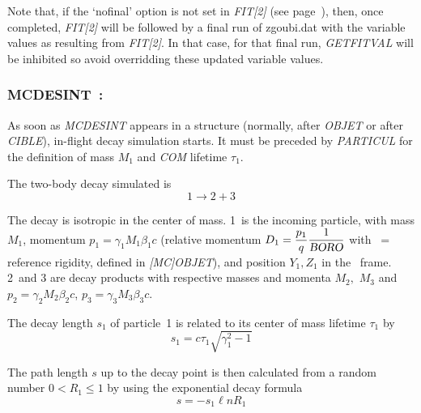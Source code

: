\medskip

Note that, if the `nofinal' option  
is not set in \textsl{FIT[2]} (see page~\pageref{nofinal}), then, once completed, \textsl{FIT[2]} will be followed by a final  
run of zgoubi.dat with the variable values as resulting from \textsl{FIT[2]}. In that case, for that final run, 
\textsl{GETFITVAL} will be inhibited so avoid overridding these updated variable values. 


\newpage

\subsubsection*{MCDESINT~: \MCDESINTTitl \protect\cite{Biblio11}}
\medskip 
\label{MCDESINT}

 As soon as \textsl{MCDESINT}  appears in a structure
(normally, after \textsl{OBJET} or after \textsl{CIBLE}),
 in-flight decay simulation starts. 
It must be preceded by \textsl{PARTICUL} for the definition of mass $ M_1 $ 
and \textsl{COM} 
lifetime $\tau_1$. 

\noindent The two-body decay simulated is 
 $$ 1 \longrightarrow  2+3 $$

\noindent The decay is isotropic in the center of mass. 
1~is the incoming particle, with mass $ M_1 $, momentum $ p_1=\gamma_1 M_1\beta_ 1c $ (relative 
momentum $ D_1= \dfrac{p_1 }{ q} \dfrac{1 }{\textsl{BORO}} $ with \BORO\   = reference
rigidity, defined in \textsl{[MC]OBJET}),  and position $ Y_1,Z_1 $ in the \zgou\ frame. 
2~and 3 are decay products with respective masses and momenta $ M_2, $ $ M_3 $ and 
$ p_2=\gamma_ 2M_2\beta_2c$,  $ p_3=\gamma_ 3M_3\beta_ 3c$.  

\noindent The decay length  $ s_1 $ of particle~1 is related to its center of 
mass lifetime $ \tau_ 1 $ by 
$$ s_1=c\tau_ 1 \sqrt{ \gamma^ 2_1 -1} $$

\noindent The path length $ s $ up to the decay point is then calculated from
a random number $ 0<R_1\leq 1 $ by using the exponential decay formula
$$ s = - s_1 \ell n R_1 $$

